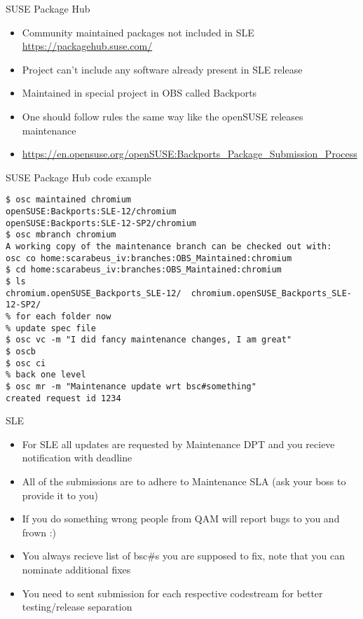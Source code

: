 \documentclass{beamer}
\begin{document}
\begin{frame}[t]{SUSE Package Hub}
	\begin{itemize}
	\item Community maintained packages not included in SLE \url{https://packagehub.suse.com/}
	\item Project can't include any software already present in SLE release
	\item Maintained in special project in OBS called Backports
	\item One should follow rules the same way like the openSUSE releases maintenance
	\item \url{https://en.opensuse.org/openSUSE:Backports\_Package\_Submission\_Process}
	\end{itemize}
\end{frame}

\begin{frame}[fragile]{SUSE Package Hub code example}
	\begin{scriptsize}
	\begin{verbatim}
$ osc maintained chromium
openSUSE:Backports:SLE-12/chromium
openSUSE:Backports:SLE-12-SP2/chromium
$ osc mbranch chromium
A working copy of the maintenance branch can be checked out with:
osc co home:scarabeus_iv:branches:OBS_Maintained:chromium
$ cd home:scarabeus_iv:branches:OBS_Maintained:chromium
$ ls
chromium.openSUSE_Backports_SLE-12/  chromium.openSUSE_Backports_SLE-12-SP2/
% for each folder now
% update spec file
$ osc vc -m "I did fancy maintenance changes, I am great"
$ oscb
$ osc ci
% back one level
$ osc mr -m "Maintenance update wrt bsc#something"
created request id 1234
	\end{verbatim}
	\end{scriptsize}
\end{frame}

\begin{frame}[t]{SLE}
	\begin{itemize}
	\item For SLE all updates are requested by Maintenance DPT and you recieve notification with deadline
	\item All of the submissions are to adhere to Maintenance SLA (ask your boss to provide it to you)
	\item If you do something wrong people from QAM will report bugs to you and frown :)
	\item You always recieve list of bsc\#s you are supposed to fix, note that you can nominate additional fixes
	\item You need to sent submission for each respective codestream for better testing/release separation
	\end{itemize}
\end{frame}
\end{document}
